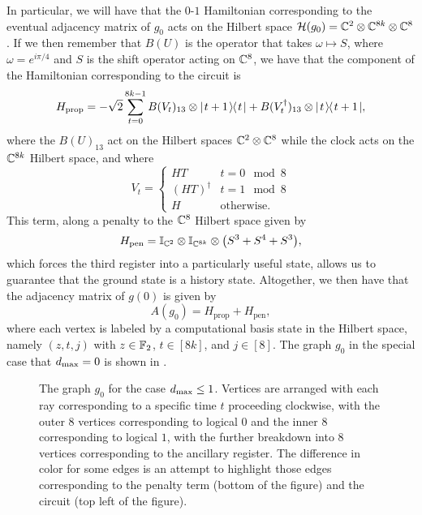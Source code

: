 \documentclass[../thesis-main/thesis-main]{subfiles}
\begin{document}
In particular, we will have that the $0$-$1$ Hamiltonian corresponding to the eventual adjacency matrix of $g_0$ acts on the Hilbert space $\mathcal{H}(g_0) = \mathbb{C}^{2}\otimes \mathbb{C}^{8k} \otimes \mathbb{C}^8$.  If we then remember that $B(U)$ is the operator that takes $\omega \mapsto S$, where $\omega = e^{i \pi/4}$ and  $S$ is the shift operator acting on $\mathbb{C}^{8}$, we have that the component of the Hamiltonian corresponding to the circuit is
\begin{equation}
  H_{\text{prop}} = -\sqrt{2} \sum_{t=0}^{8k-1} B(V_{t})_{13} \otimes |\mspace{2mu} t+1 \mspace{2mu} \rangle\mspace{-2mu}\langle\mspace{2mu} t \mspace{2mu} | + B(V_{t}^\dag)_{13} \otimes |\mspace{2mu} t \mspace{2mu} \rangle\mspace{-2mu}\langle\mspace{2mu} t+1 \mspace{2mu} |,
\end{equation}
where the $B(U)_{13}$ act on the Hilbert spaces $\mathbb{C}^{2}\otimes \mathbb{C}^{8}$ while the clock acts on the $\mathbb{C}^{8k}$ Hilbert space, and where
\begin{equation}
  V_t = \begin{cases}
    HT & t = 0 \mod 8\\
    (HT)^{\dag} & t = 1 \mod 8\\
    H & \text{otherwise}.
  \end{cases}
\end{equation}
This term, along a penalty to the $\mathbb{C}^8$ Hilbert space given by
\begin{equation}
  H_{\text{pen}} = \mathbb{I}_{\mathbb{C}^2} \otimes \mathbb{I}_{\mathbb{C}^{8k}} \otimes \big( S^3 + S^4 + S^3\big),
\end{equation}
which forces the third register into a particularly useful state, allows us to guarantee that the ground state is a history state.  Altogether, we then have that the adjacency matrix of $g(0)$ is given by
\begin{equation}
  A(g_0) = H_{\text{prop}} + H_{\text{pen}},
\end{equation}
where each vertex is labeled by a computational basis state in the Hilbert space, namely $(z,t,j)$ with $z\in \mathbb{F}_2$, $t\in [8k]$, and $j\in[8]$.  The graph $g_0$ in the special case that $d_{\text{max}} = 0$ is shown in .

\begin{figure}
  \centering
  
  \caption{The graph $g_{0}$ for the case $d_{\text{max}} \leq 1$.  Vertices are arranged with each ray corresponding to a specific time $t$ proceeding clockwise, with the outer 8 vertices corresponding to logical $0$ and the inner 8 corresponding to logical $1$, with the further breakdown into 8 vertices corresponding to the ancillary register.  The difference in color for some edges is an attempt to highlight those edges corresponding to the penalty term (bottom of the figure) and the circuit (top left of the figure).  \label{fig:g_0}}
\end{figure}
\end{document}
